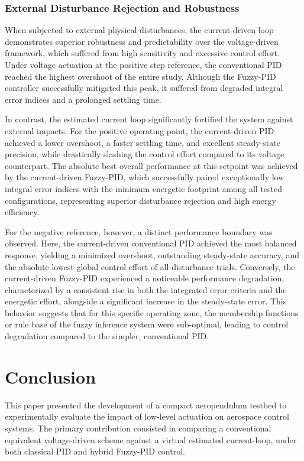 \documentclass[pdflatex,sn-mathphys-num,iicol]{sn-jnl}
\theoremstyle{thmstyleone}%
\theoremstyle{thmstyletwo}%
\theoremstyle{thmstylethree}%
\begin{document}
\subsubsection{External Disturbance Rejection and Robustness}
When subjected to external physical disturbances, the current-driven loop demonstrates superior robustness and predictability over the voltage-driven framework, which suffered from high sensitivity and excessive control effort. Under voltage actuation at the positive step reference, the conventional PID reached the highest overshoot of the entire study. Although the Fuzzy-PID controller successfully mitigated this peak, it suffered from degraded integral error indices and a prolonged settling time. 

In contrast, the estimated current loop significantly fortified the system against external impacts. For the positive operating point, the current-driven PID achieved a lower overshoot, a faster settling time, and excellent steady-state precision, while drastically slashing the control effort compared to its voltage counterpart. The absolute best overall performance at this setpoint was achieved by the current-driven Fuzzy-PID, which successfully paired exceptionally low integral error indices with the minimum energetic footprint among all tested configurations, representing superior disturbance rejection and high energy efficiency.

For the negative reference, however, a distinct performance boundary was observed. Here, the current-driven conventional PID achieved the most balanced response, yielding a minimized overshoot, outstanding steady-state accuracy, and the absolute lowest global control effort of all disturbance trials. Conversely, the current-driven Fuzzy-PID experienced a noticeable performance degradation, characterized by a consistent rise in both the integrated error criteria and the energetic effort, alongside a significant increase in the steady-state error. This behavior suggests that for this specific operating zone, the membership functions or rule base of the fuzzy inference system were sub-optimal, leading to control degradation compared to the simpler, conventional PID.


\section{Conclusion}\label{sec7}

This paper presented the development of a compact aeropendulum testbed to experimentally evaluate the impact of low-level actuation on aerospace control systems. The primary contribution consisted in comparing a conventional equivalent voltage-driven scheme against a virtual estimated current-loop, under both classical PID and hybrid Fuzzy-PID control.
\end{document}
